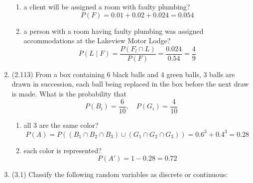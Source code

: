 \documentclass[basic, header]{nosvagor-notes}
\begin{document}
\begin{enumerate}[itemsep=4em]
\begin{enumerate}
      \item a client will be assigned a room with faulty plumbing?
        \[%
          P(F) = 0.01 + 0.02 + 0.024 = \boxed{0.054}
        \]%

      \item a person with a room having faulty plumbing was assigned
        accommodations at the Lakeview Motor Lodge?
        \[%
          P(L \mid F) = \frac{P(F_l \cap L)}{P(F)} = \frac{0.024}{0.54} = \boxed{\frac{4}{9}}
        \]%

    \end{enumerate}

  \newpage %

  \item (2.113) From a box containing 6 black balls and 4 green balls, 3 balls
    are drawn in succession, each ball being replaced in the box before the
    next draw is made. What is the probability that
    \[%
      P(B_i) = \frac{6}{10}, \quad P(G_i) = \frac{4}{10}
    \]%

    \begin{enumerate}

      \item all 3 are the same color?
        \[%
          P(A) = P\left((B_1 \cap B_2 \cap B_3) \cup (G_1 \cap G_2 \cap G_3)\right)
          = 0.6^3 + 0.4^3 = \boxed{0.28}
        \]%

      \item each color is represented?
        \[%
          P(A') = 1 - 0.28 = \boxed{0.72}
        \]%

    \end{enumerate}

  \item (3.1) Classify the following random variables as discrete or
    continuous:


\end{enumerate}
\end{document}
